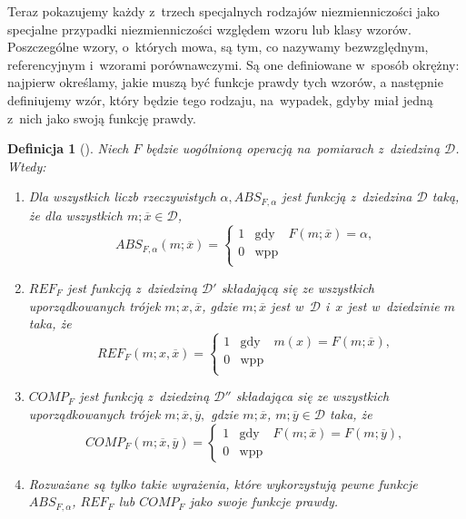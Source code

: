 \documentclass[12pt,a4paper]{report}
\newtheorem{definition}{Definicja}[chapter]
\begin{document}
Teraz pokazujemy każdy z~trzech specjalnych rodzajów niezmienniczości jako specjalne przypadki niezmienniczości względem wzoru lub klasy wzorów. Poszczególne wzory, o~których mowa, są tym, co nazywamy bezwzględnym, referencyjnym i~wzorami porównawczymi. Są one definiowane w~sposób okrężny: najpierw określamy, jakie muszą być funkcje prawdy tych wzorów, a następnie definiujemy wzór, który będzie tego rodzaju, na~wypadek, gdyby miał jedną z~nich jako swoją funkcję prawdy. 
\begin{definition}[{\citep[Def. 9]{adams1965theory}}]
Niech $F$ będzie uogólnioną operacją na~pomiarach z~dziedziną $\mathcal{D}$. Wtedy:
\begin{enumerate}
\item
Dla wszystkich liczb rzeczywistych $\alpha, ABS_{F,\alpha}$ jest funkcją z~dziedzina $\mathcal{D}$ taką, że dla wszystkich $m;\overline{x} \in \mathcal{D}$,
\begin{equation*}
ABS_{F,\alpha}(m;\overline{x})= \left\{ \begin{array}{lcl}
1 & \textrm{gdy} & F(m;\overline{x})=\alpha,\\
0 & \textrm{wpp}\\
\end{array} \right.
\end{equation*}
\item
$REF_{F}$ jest funkcją z~dziedziną $\mathcal{D'}$ składającą się ze wszystkich uporządkowanych trójek $m;x,\overline{x}$, gdzie $m;\overline{x}$ jest w~$\mathcal{D}$ i~$x$ jest w~dziedzinie $m$ taka, że
\begin{equation*}
REF_{F}(m;x,\overline{x})= \left\{ \begin{array}{lcl}
1 & \textrm{gdy} & m(x)=F(m;\overline{x}),\\
0 & \textrm{wpp}\\
\end{array} \right.
\end{equation*}
\item
$COMP_{F}$ jest funkcją z~dziedziną $\mathcal{D''}$ składająca się ze wszystkich uporządkowanych trójek $m;\overline{x},\overline{y},$ gdzie $m;\overline{x}$, $m;\overline{y} \in \mathcal{D}$ taka, że
\begin{equation*}
COMP_{F}(m;\overline{x},\overline{y})= \left\{ \begin{array}{lcl}
1 & \textrm{gdy} & F(m;\overline{x})=F(m;\overline{y}),\\
0 & \textrm{wpp}
\end{array} \right.
\end{equation*}
\item
Rozważane są tylko takie wyrażenia, które wykorzystują pewne funkcje $ABS_{F,\alpha}$, $REF_{F}$ lub $COMP_{F}$ jako swoje funkcje prawdy.
\end{enumerate}
\end{definition}
\end{document}
